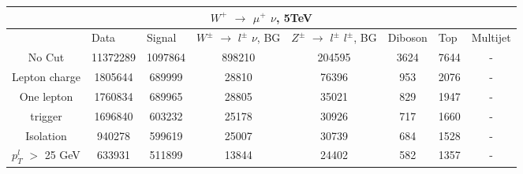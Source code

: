 \documentclass[10pt]{article}
\begin{document}
 										
\begin{center}										
\begin{table}[H] 										
\begin{adjustbox}{width=1\textwidth}								
\begin{tabular}{cccccccc} 									
\\ \hline \hline  										
\multicolumn{8}{c}{$W^{+}$ $\rightarrow$ $\mu^{+}$ $\nu$, 5TeV}  									
\\ \hline \hline                            						
\multicolumn{1}{|c|}{}   & \multicolumn{1}{l|}{Data} & \multicolumn{1}{l|}{Signal} & \multicolumn{1}{l|}{$W^{\pm}$ $\rightarrow$ $l^{\pm}$ $\nu$, BG} & \multicolumn{1}{l|}{$Z^{\pm}$ $\rightarrow$ $l^{\pm}$ $l^{\pm}$, BG} & \multicolumn{1}{l|}{Diboson} & \multicolumn{1}{l|}{Top} & \multicolumn{1}{l|}{Multijet} \\ \hline 
\multicolumn{1}{|c|}{No Cut}  & \multicolumn{1}{c|}{11372289} & \multicolumn{1}{c|}{1097864} & \multicolumn{1}{c|}{898210} & \multicolumn{1}{c|}{204595} & \multicolumn{1}{c|}{3624} & \multicolumn{1}{c|}{7644} & \multicolumn{1}{c|}{-}  \\ \hline 
\multicolumn{1}{|c|}{Lepton charge}  & \multicolumn{1}{c|}{1805644} & \multicolumn{1}{c|}{689999} & \multicolumn{1}{c|}{28810} & \multicolumn{1}{c|}{76396} & \multicolumn{1}{c|}{953} & \multicolumn{1}{c|}{2076} & \multicolumn{1}{c|}{-}  \\ \hline 
\multicolumn{1}{|c|}{One lepton}  & \multicolumn{1}{c|}{1760834} & \multicolumn{1}{c|}{689965} & \multicolumn{1}{c|}{28805} & \multicolumn{1}{c|}{35021} & \multicolumn{1}{c|}{829} & \multicolumn{1}{c|}{1947} & \multicolumn{1}{c|}{-}  \\ \hline 
\multicolumn{1}{|c|}{trigger}  & \multicolumn{1}{c|}{1696840} & \multicolumn{1}{c|}{603232} & \multicolumn{1}{c|}{25178} & \multicolumn{1}{c|}{30926} & \multicolumn{1}{c|}{717} & \multicolumn{1}{c|}{1660} & \multicolumn{1}{c|}{-}  \\ \hline 
\multicolumn{1}{|c|}{Isolation}  & \multicolumn{1}{c|}{940278} & \multicolumn{1}{c|}{599619} & \multicolumn{1}{c|}{25007} & \multicolumn{1}{c|}{30739} & \multicolumn{1}{c|}{684} & \multicolumn{1}{c|}{1528} & \multicolumn{1}{c|}{-}  \\ \hline 
\multicolumn{1}{|c|}{$p_{T}^{l}$ $>$ 25 GeV}  & \multicolumn{1}{c|}{633931} & \multicolumn{1}{c|}{511899} & \multicolumn{1}{c|}{13844} & \multicolumn{1}{c|}{24402} & \multicolumn{1}{c|}{582} & \multicolumn{1}{c|}{1357} & \multicolumn{1}{c|}{-}  \\ \hline 

\end{tabular}
\end{adjustbox}
\end{table}
\end{center}
\end{document}
